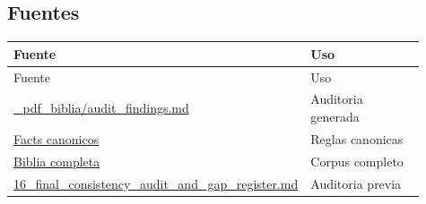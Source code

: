 \subsection{Fuentes}


\begin{center}
\scriptsize
\begin{longtable}{>{\raggedright\arraybackslash}p{0.455\linewidth} >{\raggedright\arraybackslash}p{0.455\linewidth}}
\toprule
Fuente & Uso \\
\midrule
\endfirsthead
\toprule
Fuente & Uso \\
\midrule
\endhead
\href{file:///E:/Laboral/_pdf_biblia/audit_findings.md}{\_pdf\_biblia/audit\_findings.md} & Auditoria generada \\
\href{file:///E:/Laboral/_obsidian/06_CANONICAL_FACTS_AND_ERRATA.md}{Facts canonicos} & Reglas canonicas \\
\href{file:///E:/Laboral/_obsidian/10_BIBLIA_COMPLETA.md}{Biblia completa} & Corpus completo \\
\href{file:///E:/Laboral/16_final_consistency_audit_and_gap_register.md}{16\_final\_consistency\_audit\_and\_gap\_register.md} & Auditoria previa \\
\bottomrule
\end{longtable}
\end{center}
